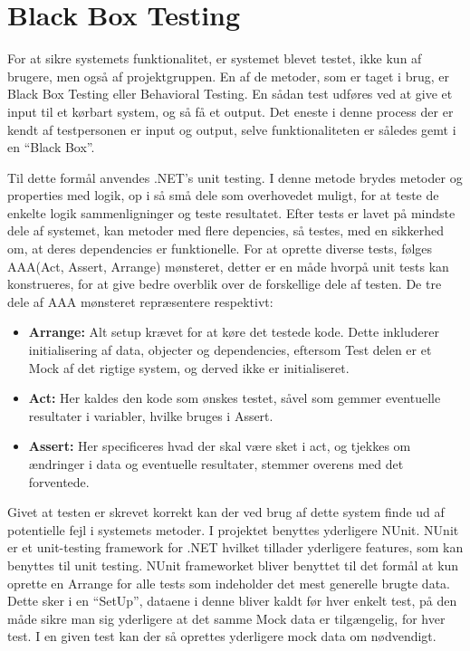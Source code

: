 \section{Black Box Testing}\label{BBtest}
For at sikre systemets funktionalitet, er systemet blevet testet, ikke kun af brugere, men også af projektgruppen.
En af de metoder, som er taget i brug, er Black Box Testing eller Behavioral Testing.
En sådan test udføres ved at give et input til et kørbart system, og så få et output.
Det eneste i denne process der er kendt af testpersonen er input og output, selve funktionaliteten er således gemt i en ``Black Box''. %

Til dette formål anvendes .NET's unit testing.
I denne metode brydes metoder og properties med logik, op i så små dele som overhovedet muligt, for at teste de enkelte logik sammenligninger og teste resultatet.
Efter tests er lavet på mindste dele af systemet, kan metoder med flere depencies, så testes, med en sikkerhed om, at deres dependencies er funktionelle. %
For at oprette diverse tests, følges AAA(Act, Assert, Arrange) mønsteret, detter er en måde hvorpå unit tests kan konstrueres, for at give bedre overblik over de forskellige dele af testen.
De tre dele af AAA mønsteret repræsentere respektivt:
\begin{itemize}
  \item \textbf{Arrange:} Alt setup krævet for at køre det testede kode. Dette inkluderer initialisering af data, objecter og dependencies, eftersom Test delen er et Mock af det rigtige system, og derved ikke er initialiseret.
  \item \textbf{Act:} Her kaldes den kode som ønskes testet, såvel som gemmer eventuelle resultater i variabler, hvilke bruges i Assert.
  \item \textbf{Assert:} Her specificeres hvad der skal være sket i act, og tjekkes om ændringer i data og eventuelle resultater, stemmer overens med det forventede.
\end{itemize}
Givet at testen er skrevet korrekt kan der ved brug af dette system finde ud af potentielle fejl i systemets metoder.
I projektet benyttes yderligere NUnit.
NUnit er et unit-testing framework for .NET hvilket tillader yderligere features, som kan benyttes til unit testing.
NUnit frameworket bliver benyttet til det formål at kun oprette en Arrange for alle tests som indeholder det mest generelle brugte data.
Dette sker i en ``SetUp'', dataene i denne bliver kaldt før hver enkelt test, på den måde sikre man sig yderligere at det samme Mock data er tilgængelig, for hver test.
I en given test kan der så oprettes yderligere mock data om nødvendigt.


